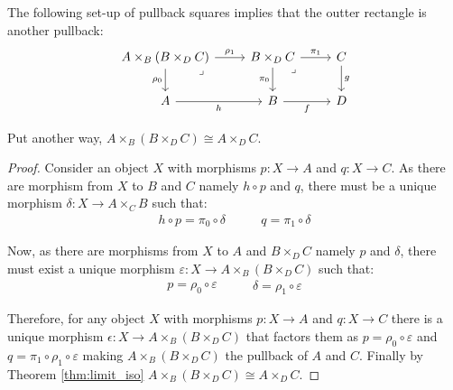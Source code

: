 \begin{theorem}
  The following set-up of pullback squares implies that the outter rectangle
  is another pullback:
  \[\begin{tikzcd}[ampersand replacement=\&]
    {A\times_B(B\times_D C)} \& {B\times_D C} \& C \\
    A \& B \& D
    \arrow["{\pi_0}"', from=1-2, to=2-2]
    \arrow["{\pi_1}", from=1-2, to=1-3]
    \arrow["f"', from=2-2, to=2-3]
    \arrow["g", from=1-3, to=2-3]
    \arrow["h"', from=2-1, to=2-2]
    \arrow["{\rho_0}"', from=1-1, to=2-1]
    \arrow["{\rho_1}", from=1-1, to=1-2]
    \arrow["\lrcorner"{anchor=center, pos=0.125}, draw=none, from=1-2, to=2-3]
    \arrow["\lrcorner"{anchor=center, pos=0.125}, draw=none, from=1-1, to=2-2]
  \end{tikzcd}\]

  Put another way, $A\times_B (B\times_D C) \cong A\times_D C$.
  \begin{proof}
    Consider an object $X$ with morphisms $p: X\to A$ and $q:X\to C$. As there
    are morphism from $X$ to $B$ and $C$ namely $h\circ p$ and $q$, there must
    be a unique morphism $\delta: X\to A\times_C B$ such that:
    \[
      \begin{gathered}
        h\circ p = \pi_0 \circ \delta
      \end{gathered}
      \qquad
      \begin{gathered}
        q = \pi_1 \circ \delta
      \end{gathered}
    \]

    Now, as there are morphisms from $X$ to $A$ and $B\times_D C$ namely $p$ and
    $\delta$, there must exist a unique morphism $\varepsilon: X\to
    A\times_B(B\times_D C)$ such that:
    \[
      \begin{gathered}
        p = \rho_0 \circ \varepsilon
      \end{gathered}
      \qquad
      \begin{gathered}
        \delta = \rho_1 \circ \varepsilon
      \end{gathered}
    \]

    Therefore, for any object $X$ with morphisms $p:X\to A$ and $q:X\to C$ there
    is a unique morphism $\epsilon: X\to A\times_B(B\times_D C)$ that factors
    them as $p=\rho_0 \circ \varepsilon$ and $q=\pi_1\circ \rho_1\circ
    \varepsilon$ making $A\times_B(B\times_D C)$ the pullback of $A$ and $C$.
    Finally by Theorem \ref{thm:limit_iso} $A\times_B(B\times_D C) \cong
    A\times_D C$.
  \end{proof}
\end{theorem}


